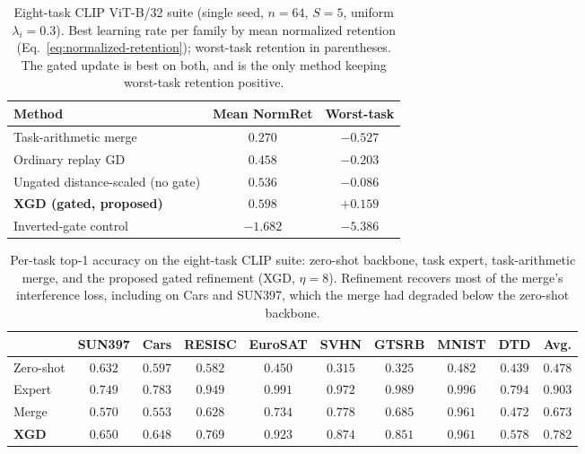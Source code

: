 \documentclass{article} %
\begin{document}
\begin{table}[t]
\centering
\caption{Eight-task CLIP ViT-B/32 suite (single seed, $n=64$, $S=5$, uniform $\lambda_i=0.3$). Best learning rate per family by mean normalized retention (Eq.~\eqref{eq:normalized-retention}); worst-task retention in parentheses. The gated update is best on both, and is the only method keeping worst-task retention positive.}
\label{tab:clip8}
\begin{tabular}{lcc}
\toprule
Method & Mean NormRet & Worst-task \\
\midrule
Task-arithmetic merge & $0.270$ & $-0.527$ \\
Ordinary replay GD & $0.458$ & $-0.203$ \\
Ungated distance-scaled (no gate) & $0.536$ & $-0.086$ \\
\textbf{XGD (gated, proposed)} & $\mathbf{0.598}$ & $\mathbf{+0.159}$ \\
\midrule
Inverted-gate control & $-1.682$ & $-5.386$ \\
\bottomrule
\end{tabular}
\end{table}

\begin{table}[t]
\centering
\footnotesize
\setlength{\tabcolsep}{4pt}
\caption{Per-task top-1 accuracy on the eight-task CLIP suite: zero-shot backbone, task expert, task-arithmetic merge, and the proposed gated refinement (XGD, $\eta=8$). Refinement recovers most of the merge's interference loss, including on Cars and SUN397, which the merge had degraded below the zero-shot backbone.}
\label{tab:clip8pt}
\begin{tabular}{lccccccccc}
\toprule
 & SUN397 & Cars & RESISC & EuroSAT & SVHN & GTSRB & MNIST & DTD & Avg. \\
\midrule
Zero-shot & $0.632$ & $0.597$ & $0.582$ & $0.450$ & $0.315$ & $0.325$ & $0.482$ & $0.439$ & $0.478$ \\
Expert    & $0.749$ & $0.783$ & $0.949$ & $0.991$ & $0.972$ & $0.989$ & $0.996$ & $0.794$ & $0.903$ \\
Merge     & $0.570$ & $0.553$ & $0.628$ & $0.734$ & $0.778$ & $0.685$ & $0.961$ & $0.472$ & $0.673$ \\
\textbf{XGD} & $\mathbf{0.650}$ & $\mathbf{0.648}$ & $\mathbf{0.769}$ & $\mathbf{0.923}$ & $\mathbf{0.874}$ & $\mathbf{0.851}$ & $0.961$ & $\mathbf{0.578}$ & $\mathbf{0.782}$ \\
\bottomrule
\end{tabular}
\end{table}
\end{document}
